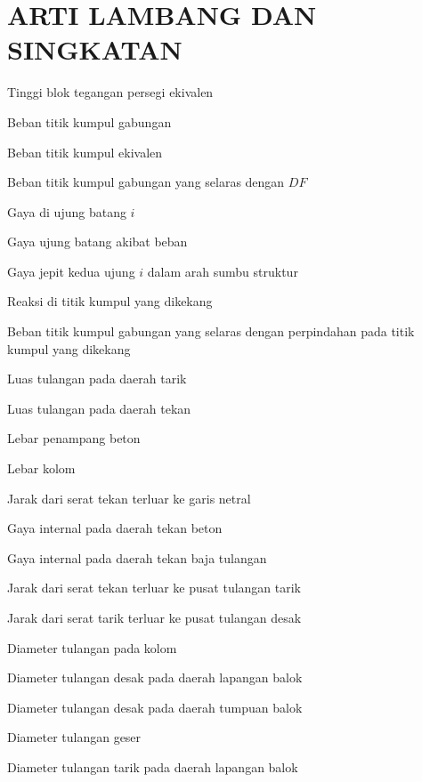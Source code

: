 \chapter*{ARTI LAMBANG DAN SINGKATAN}

\begin{description}[style=nextline,leftmargin=2.2cm,labelwidth=2cm]
\item[$a$] Tinggi blok tegangan persegi ekivalen
\item[$AC$] Beban titik kumpul gabungan
\item[$AE$] Beban titik kumpul ekivalen
\item[$AFC$] Beban titik kumpul gabungan yang selaras dengan $DF$
\item[$AM_i$] Gaya di ujung batang $i$
\item[$AML$] Gaya ujung batang akibat beban
\item[$AMS_i$] Gaya jepit kedua ujung $i$ dalam arah sumbu struktur
\item[$AR$] Reaksi di titik kumpul yang dikekang
\item[$ARC$] Beban titik kumpul gabungan yang selaras dengan perpindahan pada titik kumpul yang dikekang
\item[$AS$] Luas tulangan pada daerah tarik
\item[$AS'$] Luas tulangan pada daerah tekan
\item[$b$] Lebar penampang beton
\item[$B$] Lebar kolom
\item[$c$] Jarak dari serat tekan terluar ke garis netral
\item[$CC$] Gaya internal pada daerah tekan beton
\item[$CS$] Gaya internal pada daerah tekan baja tulangan
\item[$d$] Jarak dari serat tekan terluar ke pusat tulangan tarik
\item[$d'$] Jarak dari serat tarik terluar ke pusat tulangan desak
\item[$dia$] Diameter tulangan pada kolom
\item[$diatldslp$] Diameter tulangan desak pada daerah lapangan balok
\item[$diatldstm$] Diameter tulangan desak pada daerah tumpuan balok
\item[$diatlgs$] Diameter tulangan geser
\item[$diatltrlp$] Diameter tulangan tarik pada daerah lapangan balok

\end{description}
